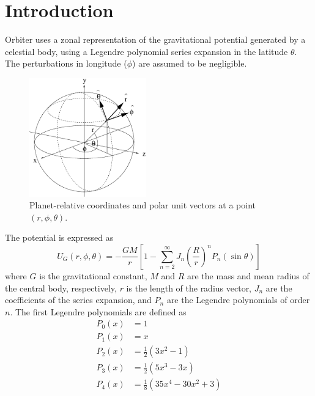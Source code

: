 \documentclass[a4paper]{article}
\begin{document}

\newcommand{\vR}[1]{\ensuremath{\vec{R}_{#1}}}
\newcommand{\nR}[1]{\ensuremath{|\vR{#1}|}}

\maketitle

\section{Introduction}
Orbiter uses a zonal representation of the gravitational potential generated by a celestial body, using a Legendre polynomial series expansion in the latitude $\theta$. The perturbations in longitude ($\phi$) are assumed to be negligible.
\begin{figure}\centering
\includegraphics[width=0.45\textwidth]{sphere.eps}
\caption{Planet-relative coordinates and polar unit vectors at a point $(r,\phi,\theta)$.}
\end{figure}
The potential is expressed as
\begin{equation}\label{eq:gpot}
U_G(r,\phi,\theta) = -\frac{GM}{r} \left[ 1 - \sum_{n=2}^\infty J_n \left(\frac{R}{r}\right)^n P_n(\sin \theta) \right]
\end{equation}
where $G$ is the gravitational constant, $M$ and $R$ are the mass and mean radius of the central body, respectively, $r$ is the length of the radius vector, $J_n$ are the coefficients of the series expansion, and $P_n$ are the Legendre polynomials of order $n$.
The first Legendre polynomials are defined as
\begin{equation}
\begin{split}
P_0(x) &= 1\\
P_1(x) &= x\\
P_2(x) &= \frac{1}{2}(3x^2 - 1)\\
P_3(x) &= \frac{1}{2}(5x^3 - 3x)\\
P_4(x) &= \frac{1}{8}(35x^4 - 30x^2 +3)
\end{split}
\end{equation}
\end{document}
